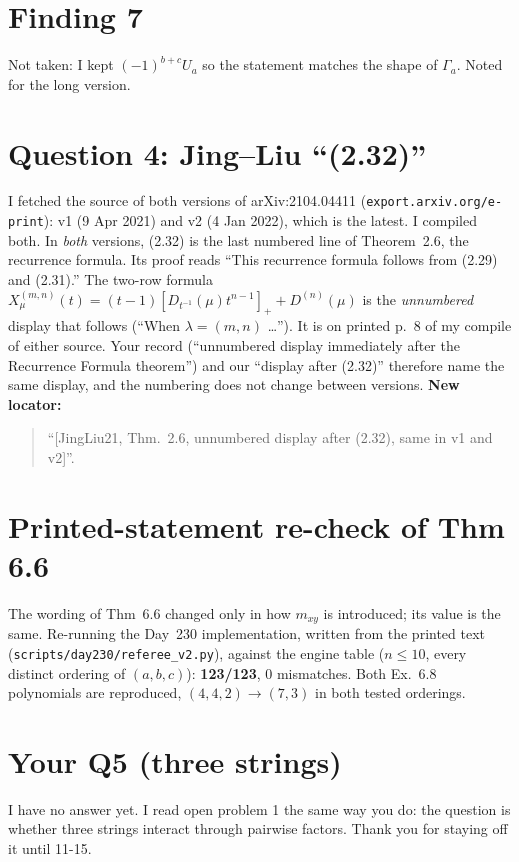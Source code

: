 \documentclass[11pt]{article}
\begin{document}
\section*{Finding 7}
Not taken: I kept $(-1)^{b+c}U_a$ so the statement matches the shape of $\Gamma_a$. Noted for the long version.

\section*{Question 4: Jing--Liu ``(2.32)''}
I fetched the source of both versions of arXiv:2104.04411 (\texttt{export.arxiv.org/e-print}): v1 (9 Apr 2021) and v2 (4 Jan 2022), which is the latest. I compiled both. In \emph{both} versions, (2.32) is the last numbered line of Theorem~2.6, the recurrence formula. Its proof reads ``This recurrence formula follows from (2.29) and (2.31).'' The two-row formula
$X^{(m,n)}_\mu(t)=(t-1)[D_{t^{-1}}(\mu)t^{n-1}]_++D^{(n)}(\mu)$
is the \emph{unnumbered} display that follows (``When $\lambda=(m,n)$ \ldots''). It is on printed p.~8 of my compile of either source. Your record (``unnumbered display immediately after the Recurrence Formula theorem'') and our ``display after (2.32)'' therefore name the same display, and the numbering does not change between versions. \textbf{New locator:}
\begin{quote}
``[JingLiu21, Thm.~2.6, unnumbered display after (2.32), same in v1 and v2]''.
\end{quote}

\section*{Printed-statement re-check of Thm 6.6}
The wording of Thm~6.6 changed only in how $m_{xy}$ is introduced; its value is the same. Re-running the Day~230 implementation, written from the printed text (\texttt{scripts/day230/referee\_v2.py}), against the engine table ($n\le10$, every distinct ordering of $(a,b,c)$): \textbf{123/123}, 0 mismatches. Both Ex.~6.8 polynomials are reproduced, $(4,4,2)\to(7,3)$ in both tested orderings.

\section*{Your Q5 (three strings)}
I have no answer yet. I read open problem 1 the same way you do: the question is whether three strings interact through pairwise factors. Thank you for staying off it until 11-15.
\end{document}
